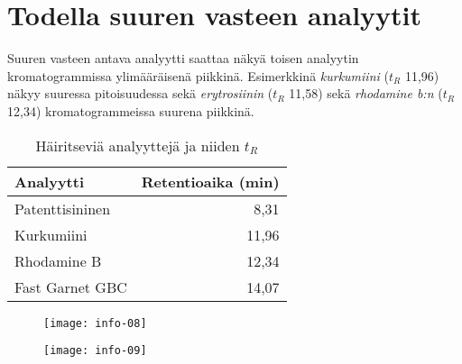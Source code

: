 \section{Todella suuren vasteen analyytit}
\vspace{-24pt}
Suuren vasteen antava analyytti saattaa näkyä toisen analyytin kromatogrammissa ylimääräisenä piikkinä. Esimerkkinä \textit{kurkumiini} ($t_R$ 11,96) näkyy suuressa pitoisuudessa sekä \textit{erytrosiinin} ($t_R$ 11,58) sekä \textit{rhodamine b:n} ($t_R$ 12,34) kromatogrammeissa suurena piikkinä.
\begin{table}[!htbp]
  \centering
  \caption{Häiritseviä analyyttejä ja niiden $t_R$}
    \begin{tabular}{lr}
    \toprule
    Analyytti & Retentioaika (min)\\
    \midrule
    Patenttisininen & 8,31 \\
    Kurkumiini & 11,96 \\
    Rhodamine B & 12,34 \\
    Fast Garnet GBC & 14,07 \\
    \bottomrule
    \end{tabular}%
  \label{tab:suurianalyytti}%
\end{table}%
\begin{figure}[!h]
  \centering
    \texttt{[image: info-08]}
\end{figure}
\begin{figure}[!ht]
  \centering
    \texttt{[image: info-09]}
\end{figure}
\restoregeometry
